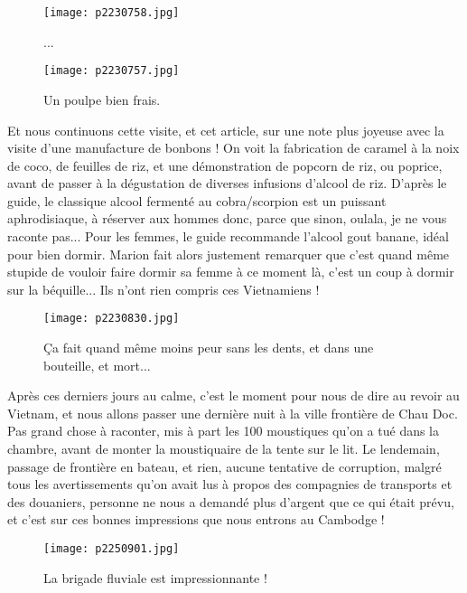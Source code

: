 \documentclass{book}
\begin{document}
\begin{figure}[h]
\centering
\texttt{[image: p2230758.jpg]}
\caption*{...}
\end{figure}


\begin{figure}[h]
\centering
\texttt{[image: p2230757.jpg]}
\caption*{Un poulpe bien frais.}
\end{figure}

Et nous continuons cette visite, et cet article, sur une note plus joyeuse avec la visite d'une manufacture de bonbons !  On voit la fabrication de caramel à la noix de coco, de feuilles de riz, et une démonstration de popcorn de riz, ou poprice, avant de passer à la dégustation de diverses infusions d'alcool de riz. D'après le guide, le classique alcool fermenté au cobra/scorpion est un puissant aphrodisiaque, à réserver aux hommes donc, parce que sinon, oulala, je ne vous raconte pas... Pour les femmes, le guide recommande l'alcool gout banane, idéal pour bien dormir. Marion fait alors justement remarquer que c'est quand même stupide de vouloir faire dormir sa femme à ce moment là, c'est un coup à dormir sur la béquille... Ils n'ont rien compris ces Vietnamiens !


\begin{figure}[h]
\centering
\texttt{[image: p2230830.jpg]}
\caption*{Ça fait quand même moins peur sans les dents, et dans une bouteille, et mort...}
\end{figure}

Après ces derniers jours au calme, c'est le moment pour nous de dire au revoir au Vietnam, et nous allons passer une dernière nuit à la ville frontière de Chau Doc. Pas grand chose à raconter, mis à part les 100 moustiques qu'on a tué dans la chambre, avant de monter la moustiquaire de la tente sur le lit. Le lendemain, passage de frontière en bateau, et rien, aucune tentative de corruption, malgré tous les avertissements qu'on avait lus à propos des compagnies de transports et des douaniers, personne ne nous a demandé plus d'argent que ce qui était prévu, et c'est sur ces bonnes impressions que nous entrons au Cambodge !


\begin{figure}[h]
\centering
\texttt{[image: p2250901.jpg]}
\caption*{La brigade fluviale est impressionnante !}
\end{figure}
\end{document}
